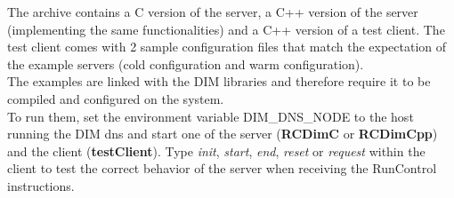 \documentclass[a4paper]{article}
\begin{document}
The archive contains a C version of the server, a C++ version of the server (implementing the same
functionalities) and a C++ version of a test client.
The test client comes with 2 sample configuration files that match the expectation of the
example servers (cold configuration and warm configuration).\\
The examples are linked with the DIM libraries and therefore require it to be compiled and
configured on the system.\\
To run them, set the environment variable DIM\_DNS\_NODE to the host running the DIM dns and start
one of the server (\textbf{RCDimC} or \textbf{RCDimCpp}) and the client (\textbf{testClient}). Type
\textit{init}, \textit{start}, \textit{end}, \textit{reset} or \textit{request} within the client to test the
correct behavior of the server when receiving the RunControl instructions.

\thebibliography{}

\end{document}
